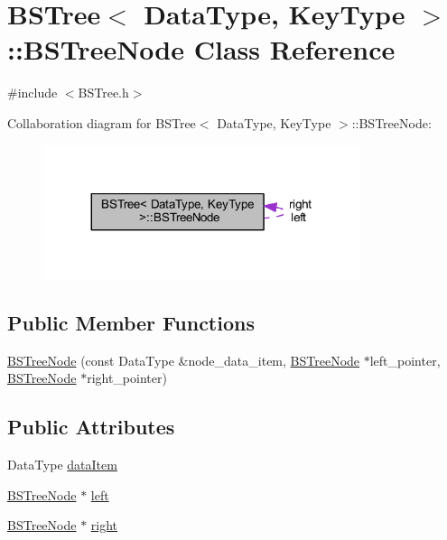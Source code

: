 \hypertarget{class_b_s_tree_1_1_b_s_tree_node}{}\section{B\+S\+Tree$<$ Data\+Type, Key\+Type $>$\+:\+:B\+S\+Tree\+Node Class Reference}
\label{class_b_s_tree_1_1_b_s_tree_node}


{\ttfamily \#include $<$B\+S\+Tree.\+h$>$}



Collaboration diagram for B\+S\+Tree$<$ Data\+Type, Key\+Type $>$\+:\+:B\+S\+Tree\+Node\+:
\nopagebreak
\begin{figure}[H]
\begin{center}
\leavevmode
\includegraphics[width=263pt]{class_b_s_tree_1_1_b_s_tree_node__coll__graph}
\end{center}
\end{figure}
\subsection*{Public Member Functions}
\begin{DoxyCompactItemize}
\item 
\hyperlink{class_b_s_tree_1_1_b_s_tree_node_a083eecbe3e2421ca811a05e1e8ba1203}{B\+S\+Tree\+Node} (const Data\+Type \&node\+\_\+data\+\_\+item, \hyperlink{class_b_s_tree_1_1_b_s_tree_node}{B\+S\+Tree\+Node} $\ast$left\+\_\+pointer, \hyperlink{class_b_s_tree_1_1_b_s_tree_node}{B\+S\+Tree\+Node} $\ast$right\+\_\+pointer)
\end{DoxyCompactItemize}
\subsection*{Public Attributes}
\begin{DoxyCompactItemize}
\item 
Data\+Type \hyperlink{class_b_s_tree_1_1_b_s_tree_node_a507c8d6dde1b8d35d9af6b4e78f38962}{data\+Item}
\item 
\hyperlink{class_b_s_tree_1_1_b_s_tree_node}{B\+S\+Tree\+Node} $\ast$ \hyperlink{class_b_s_tree_1_1_b_s_tree_node_a7a90150dd249432e240dc363955c5ca1}{left}
\item 
\hyperlink{class_b_s_tree_1_1_b_s_tree_node}{B\+S\+Tree\+Node} $\ast$ \hyperlink{class_b_s_tree_1_1_b_s_tree_node_a8d7bfd0208a562c8b8ab332e1d796563}{right}
\end{DoxyCompactItemize}


